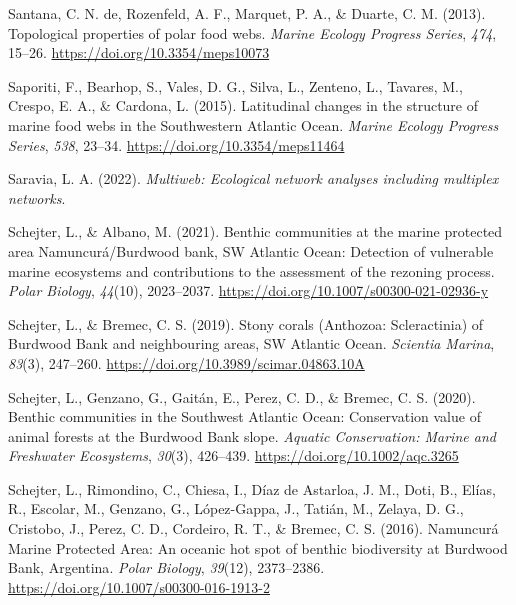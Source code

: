 \documentclass[preprint, 3p,
authoryear]{elsarticle} %
\newlength{\cslhangindent}
\newlength{\cslentryspacingunit} %
\newenvironment{CSLReferences}[2] %
 {%
  \setlength{\parindent}{0pt}
  \ifodd #1
  \let\oldpar\par
  \def\par{\hangindent=\cslhangindent\oldpar}
  \fi
  \setlength{\parskip}{#2\cslentryspacingunit}
 }%
 {}
\begin{document}
\begin{CSLReferences}{1}{0}
\leavevmode{}%
Santana, C. N. de, Rozenfeld, A. F., Marquet, P. A., \& Duarte, C. M.
(2013). Topological properties of polar food webs. \emph{Marine Ecology
Progress Series}, \emph{474}, 15--26.
\url{https://doi.org/10.3354/meps10073}

\leavevmode{}%
Saporiti, F., Bearhop, S., Vales, D. G., Silva, L., Zenteno, L.,
Tavares, M., Crespo, E. A., \& Cardona, L. (2015). Latitudinal changes
in the structure of marine food webs in the {Southwestern Atlantic
Ocean}. \emph{Marine Ecology Progress Series}, \emph{538}, 23--34.
\url{https://doi.org/10.3354/meps11464}

\leavevmode{}%
Saravia, L. A. (2022). \emph{Multiweb: {Ecological} network analyses
including multiplex networks}.

\leavevmode{}%
Schejter, L., \& Albano, M. (2021). Benthic communities at the marine
protected area {Namuncurá}/{Burdwood} bank, {SW Atlantic Ocean}:
Detection of vulnerable marine ecosystems and contributions to the
assessment of the rezoning process. \emph{Polar Biology}, \emph{44}(10),
2023--2037. \url{https://doi.org/10.1007/s00300-021-02936-y}

\leavevmode{}%
Schejter, L., \& Bremec, C. S. (2019). Stony corals ({Anthozoa}:
{Scleractinia}) of {Burdwood Bank} and neighbouring areas, {SW Atlantic
Ocean}. \emph{Scientia Marina}, \emph{83}(3), 247--260.
\url{https://doi.org/10.3989/scimar.04863.10A}

\leavevmode{}%
Schejter, L., Genzano, G., Gaitán, E., Perez, C. D., \& Bremec, C. S.
(2020). Benthic communities in the {Southwest Atlantic Ocean}:
{Conservation} value of animal forests at the {Burdwood Bank} slope.
\emph{Aquatic Conservation: Marine and Freshwater Ecosystems},
\emph{30}(3), 426--439. \url{https://doi.org/10.1002/aqc.3265}

\leavevmode{}%
Schejter, L., Rimondino, C., Chiesa, I., Díaz de Astarloa, J. M., Doti,
B., Elías, R., Escolar, M., Genzano, G., López-Gappa, J., Tatián, M.,
Zelaya, D. G., Cristobo, J., Perez, C. D., Cordeiro, R. T., \& Bremec,
C. S. (2016). Namuncurá {Marine Protected Area}: An oceanic hot spot of
benthic biodiversity at {Burdwood Bank}, {Argentina}. \emph{Polar
Biology}, \emph{39}(12), 2373--2386.
\url{https://doi.org/10.1007/s00300-016-1913-2}


\end{CSLReferences}
\end{document}
